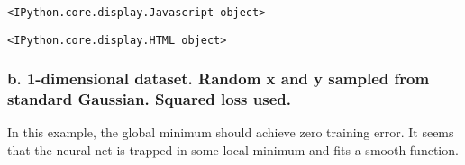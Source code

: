 \documentclass[11pt]{article}
\begin{document}
    
    \begin{verbatim}
<IPython.core.display.Javascript object>
    \end{verbatim}

    
    
    \begin{verbatim}
<IPython.core.display.HTML object>
    \end{verbatim}

    
    \subsubsection{b. 1-dimensional dataset. Random x and y sampled from
standard Gaussian. Squared loss
used.}\label{b.-1-dimensional-dataset.-random-x-and-y-sampled-from-standard-gaussian.-squared-loss-used.}

In this example, the global minimum should achieve zero training error.
It seems that the neural net is trapped in some local minimum and fits a
smooth function.
\end{document}
